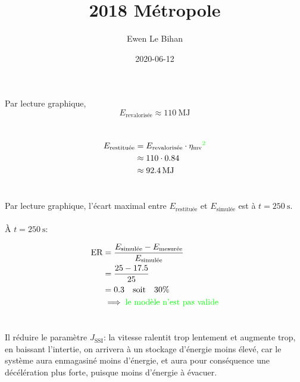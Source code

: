 \documentclass{article}
\title{2018 Métropole}
\author{Ewen Le Bihan}
\date{2020-06-12}
\begin{document}
\maketitle
\setcounter{section}{13}
\section{}
Par lecture graphique, 
\[
	E_{\text{revalorisée}} \approx \SI{110}{\mega\joule}
\] 
\section{}

\begin{align*}
	E_{\text{restituée}} &= E_{\text{revalorisée}} \cdot \eta_\text{mv}\color{green}^2 \\
			     &\approx 110 \cdot 0.84 \\
			     &\approx \SI{92.4}{\mega\joule}
\end{align*}

\section{}
Par lecture graphique, l'écart maximal entre $E_\text{restituée}$ et $E_\text{simulée}$ est à $t = \SI{250}{\second}$.

\paragraph{}
À $t = \SI{250}{\second}$:

\begin{align*}
	\text{ER} &= \frac{E_\text{simulée} - E_\text{mesurée}}{E_\text{simulée}} \\
	&= \frac{25 - 17.5}{25} \\
	&= 0.3\quad\text{soit}\quad 30\% \\
	&\implies \color{green}{\text{le modèle n'est pas valide}}
\end{align*}

\section{}
Il réduire le paramètre $J_{\text{SSI}}$: la vitesse ralentit trop lentement et augmente trop, en baissant l'intertie, on arrivera à un stockage d'énergie moins élevé, car le système aura enmagasiné moins d'énergie, et aura pour conséquence une décélération plus forte, puisque moins d'énergie à évacuer.
\end{document}
